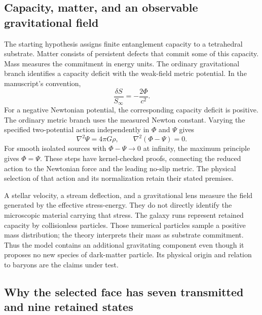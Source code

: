 \subsection{Capacity, matter, and an observable gravitational field}

The starting hypothesis assigns finite entanglement capacity to a
tetrahedral substrate. Matter consists of persistent defects that commit
some of this capacity. Mass measures the commitment in energy units.
The ordinary gravitational branch identifies a capacity deficit with the
weak-field metric potential. In the manuscript's convention,
\begin{equation}
\frac{\delta S}{S_\infty}=-\frac{2\Phi}{c^2}.
\end{equation}
For a negative Newtonian potential, the corresponding capacity deficit is
positive. The ordinary metric branch uses the measured Newton constant. Varying
the specified two-potential action independently in $\Phi$ and $\Psi$
gives
\begin{equation}
\nabla^2\Psi=4\pi G\rho,\qquad
\nabla^2(\Phi-\Psi)=0.
\end{equation}
For smooth isolated sources with $\Phi-\Psi\to0$ at infinity, the
maximum principle gives $\Phi=\Psi$. These steps have kernel-checked
proofs, connecting the reduced action to the Newtonian force and the
leading no-slip metric. The physical selection of that action and its
normalization retain their stated premises. 

A stellar velocity, a stream deflection, and a gravitational lens measure
the field generated by the effective stress-energy. They do not directly
identify the microscopic material carrying that stress. The galaxy runs
represent retained capacity by collisionless particles. Those numerical
particles sample a positive mass distribution; the theory interprets their
mass as substrate commitment. Thus the model contains an additional
gravitating component even though it proposes no new species of dark-matter
particle. Its physical origin and relation to baryons are the claims under
test. 

\subsection{Why the selected face has seven transmitted and nine retained states}

